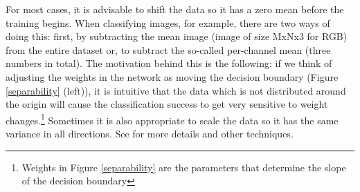 For most cases, it is advisable to shift the data so it has a zero mean before the training begins. When classifying images, for example, there are two ways of doing this: first, by subtracting the mean image (image of size MxNx3 for RGB) from the entire dataset or, to subtract the so-called per-channel mean (three numbers in total). The motivation behind this is the following: if we think of adjusting the weights in the network as moving the decision boundary (Figure \ref{separability} (left)), it is intuitive that the data which is not distributed around the origin will cause the classification success to get very sensitive to weight changes.\footnote{Weights in Figure \ref{separability} are the parameters that determine the slope of the decision boundary} \cite{stanford-L4} Sometimes it is also appropriate to scale the data so it has the same variance in all directions. See \cite{mehlig} for more details and other techniques.